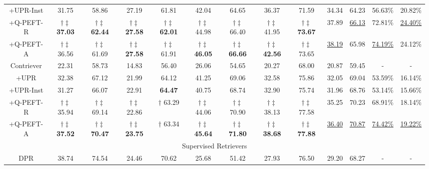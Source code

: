 \documentclass[sigconf,natbib=true,anonymous=false]{acmart}
\begin{document}
\begin{table}[!htbp]
{\begin{tabular}{c|cc|cc|cc|cc|cc|cc}
+UPR-Inst       &31.75 &58.86 & 27.19  & 61.81  & 42.04   & 64.65   & 36.37    & 71.59    & 34.34 & 64.23 & 56.63\% & 20.82\%\\ 
+Q-PEFT-R          &$\dagger \ddagger$ \textbf{37.03} &$\dagger \ddagger$ \textbf{62.44} &$\dagger \ddagger$  \textbf{27.58}  &$\dagger \ddagger$  \textbf{62.01}  &$\dagger \ddagger$  44.98   &$\dagger \ddagger$  66.40   &$\dagger \ddagger$  41.95    &$\dagger \ddagger$  \textbf{73.67}    & 37.89 & \underline{66.13} & 72.81\% & \underline{24.40\%}\\
+Q-PEFT-A        &$\dagger \ddagger$ 36.56 &$\dagger \ddagger$ 61.69 &$\dagger \ddagger$  \textbf{27.58}  &$\dagger \ddagger$  61.91  &$\dagger \ddagger$  \textbf{46.05}   &$\dagger \ddagger$  \textbf{66.66}   &$\dagger \ddagger$  \textbf{42.56}    &$\dagger \ddagger$  73.65    & \underline{38.19} & 65.98 & \underline{74.19\%} & 24.12\%\\
\midrule
Contriever      &22.31 &58.73 & 14.83  & 56.40  & 26.06   & 54.65   & 20.27    & 68.00    & 20.87 & 59.45 & - & - \\
+UPR            &32.38 &67.12 & 21.99  & 64.12  & 41.25   & 69.06   & 32.58    & 75.86    & 32.05 & 69.04 & 53.59\% & 16.14\%\\ 
+UPR-Inst       &31.27 &66.07 & 22.91  & \textbf{64.47}  & 40.75   & 68.74   & 32.90    & 75.74    & 31.96 & 68.76 & 53.14\% & 15.66\%\\
+Q-PEFT-R          &$\dagger \ddagger$ 35.94 &$\dagger \ddagger$ 69.14 &$\dagger \ddagger$  22.86  &  $\dagger$ 63.29 &$\dagger \ddagger$  44.06   &$\dagger \ddagger$  70.90   &$\dagger \ddagger$  38.13    &$\dagger \ddagger$  77.58    & 35.25 & 70.23 & 68.91\% & 18.14\%\\
+Q-PEFT-A        &$\dagger \ddagger$ \textbf{37.52} &$\dagger \ddagger$ \textbf{70.47} &$\dagger \ddagger$  \textbf{23.75}  &$\dagger$  63.34  &$\dagger \ddagger$  \textbf{45.64}   &$\dagger \ddagger$  \textbf{71.80}   &$\dagger \ddagger$  \textbf{38.68}    &$\dagger \ddagger$  \textbf{77.88}    & \underline{36.40} & \underline{70.87} & \underline{74.42\%} & \underline{19.22\%}\\
\midrule
\multicolumn{13}{c}{ Supervised Retrievers } \\
\midrule
DPR             &38.74 &74.54 & 24.46  & 70.62  & 25.68   & 51.42   & 27.93    & 76.50    & 29.20 & 68.27 &  -&-\\    

\end{tabular}}
\end{table}
\end{document}
